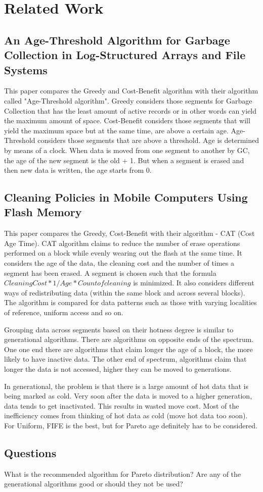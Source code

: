 \section{Related Work}
\subsection{An Age-Threshold Algorithm for Garbage Collection in Log-Structured Arrays and File Systems}
	This paper compares the Greedy and Cost-Benefit algorithm with their algorithm called "Age-Threshold algorithm". Greedy considers those segments for Garbage Collection that has the least amount of active records or in other words can yield the maximum amount of space. Cost-Benefit considers those segments that will yield the maximum space but at the same time, are above a certain age. Age-Threshold considers those segments that are above a threshold. Age is determined by means of a clock. When data is moved from one segment to another by GC, the age of the new segment is the old + 1. But when a segment is erased and then new data is written, the age starts from 0. 

\subsection{Cleaning Policies in Mobile Computers Using Flash Memory}
	This paper compares the Greedy, Cost-Benefit with their algorithm - CAT (Cost Age Time). CAT algorithm claims to reduce the number of erase operations performed on a block while evenly wearing out the flash at the same time. It considers the age of the data, the cleaning cost and the number of times a segment has been erased. A segment is chosen such that the formula $CleaningCost * 1/Age * Count of cleaning$ is minimized. It also considers different ways of redistributing data (within the same block and across several blocks). The algorithm is compared for data patterns such as those with varying localities of reference, uniform access and so on.

	Grouping data across segments based on their hotness degree is similar to generational algorithms. There are algorithms on opposite ends of the spectrum. One one end there are algorithms that claim longer the age of a block, the more likely to have inactive data. The other end of spectrum, algorithms claim that longer the data is not accessed, higher they can be moved to generations.

In generational, the problem is that there is a large amount of hot data that is being marked as cold. Very soon after the data is moved to a higher generation, data tends to get inactivated. This results in wasted move cost. Most of the inefficiency comes from thinking of hot data as cold (move hot data too soon). For Uniform, FIFE is the best, but for Pareto age definitely has to be considered. 

\subsection{Questions}
	What is the recommended algorithm for Pareto distribution? 
	Are any of the generational algorithms good or should they not be used?